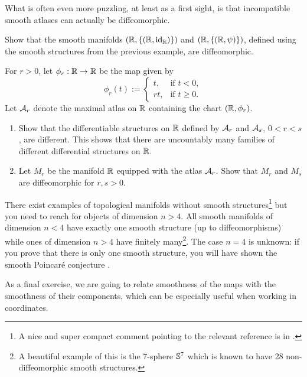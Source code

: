 What is often even more puzzling, at least as a first sight, is that incompatible smooth atlases can actually be diffeomorphic.

\begin{exercise}
  Show that the smooth manifolds $(\mathbb{R}, \{(\mathbb{R}, \operatorname{id}_{\mathbb{R}})\})$ and $(\mathbb{R}, \{(\mathbb{R}, \psi)\})$, defined using the smooth structures from the previous example, are diffeomorphic.
\end{exercise}

\begin{exercise}
  For $r>0$, let $\phi_r:\mathbb{R}\to\mathbb{R}$ be the map given by
  \begin{equation}
    \phi_r(t) := \begin{cases}
      t,  & \mbox{if } t<0,    \\
      rt, & \mbox{if } t\geq0.
    \end{cases}
  \end{equation}
  Let $\mathcal{A}_r$ denote the maximal atlas on $\mathbb{R}$ containing the chart $(\mathbb{R}, \phi_r)$.
  \begin{enumerate}
    \item Show that the differentiable structures on $\mathbb{R}$ defined by $\mathcal{A}_r$ and $\mathcal{A}_s$, $0<r<s$, are different.
          This shows that there are uncountably many families of different differential structures on $\mathbb{R}$.
    \item Let $M_r$ be the manifold $\mathbb{R}$ equipped with the atlas $\mathcal{A}_r$.
          Show that $M_r$ and $M_s$ are diffeomorphic for $r,s >0$.
  \end{enumerate}
\end{exercise}

\begin{remark}\label{remark:smoothstr}
  There exist examples of topological manifolds without smooth structures\footnote{A nice and super compact comment pointing to the relevant reference is in \cite{SE2691140}.} but you need to reach for objects of dimension $n > 4$.
  All smooth manifolds of dimension $n < 4$ have exactly one smooth structure (up to diffeomorphisms) while ones of dimension $n > 4$ have finitely many\footnote{A beautiful example of this is the $7$-sphere $\mathbb{S}^7$ which is known to have 28 non-diffeomorphic smooth structures.}.
  The case $n = 4$ is unknown: if you prove that there is only one smooth structure, you will have shown the smooth Poincar\'e conjecture \cite{notes:calegari, article:quanta:topology}.
\end{remark}

As a final exercise, we are going to relate smoothness of the maps with the smoothness of their components, which can be especially useful when working in coordinates.

